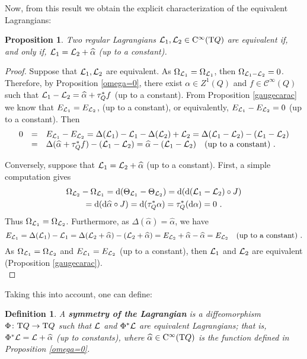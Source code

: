 \documentclass[12pt]{report}
\newtheorem{prop}[teor]{Proposition}
\newtheorem{definition}[teor]{Definition}
\def\qed{\ifvmode\removelastskip\fi
{\unskip\nobreak\hfil\penalty50\hbox{}\nobreak\hfil
\hbox{\vrule height1.2ex width1.2ex}\parfillskip=0pt
\finalhyphendemerits=0 \par\smallskip}}
\def\Lag{{\cal L}}
\def\d{{\rm d}}
\def\Tan{{\rm T}}
\def\Cinfty{{\rm C}^\infty}
\begin{document}
Now, from this result we obtain the explicit characterization of the equivalent Lagrangians:

\begin{prop}
\label{gaugeL}
Two regular Lagrangians $\Lag_1,\Lag_2\in\Cinfty (\Tan Q)$ are
equivalent if, and only if, $\Lag_1=\Lag_2+\widehat\alpha$  (up to a constant).
\end{prop}
\begin{proof}
Suppose that $\Lag_1,\Lag_2$ are equivalent.
As $\Omega_{\Lag_1}=\Omega_{\Lag_1}$, then
$\Omega_{\Lag_1-\Lag_2}=0$. Therefore, by Proposition \ref{omega=0}, 
there exist $\alpha\in Z^1(Q)$ and $f\in \mathcal{C}^\infty(Q)$ such that
$\Lag_1-\Lag_2=\widehat\alpha+\tau_Q^*f$ (up to a constant).
From Proposition \ref{gaugecarac} we know that 
$E_{\Lag_1}= E_{\Lag_2}$,  (up to a constant), or equivalently, 
$E_{\Lag_1}- E_{\Lag_2}=0$ (up to a constant). Then
$$
\begin{array}{lcl}
0&=&E_{\Lag_1}- E_{\Lag_2}=\Delta(\Lag_1)-\Lag_1
-\Delta(\Lag_2)+\Lag_2=\Delta(\Lag_1-\Lag_2)-(\Lag_1-\Lag_2)  \\ &=&
\Delta(\widehat\alpha+\tau_Q^*f)-(\Lag_1-\Lag_2) =
\widehat\alpha-(\Lag_1-\Lag_2)\quad \makebox{(up to a constant)}  \ .
 \end{array}
$$

Conversely, suppose that $\Lag_1=\Lag_2+\widehat\alpha$  (up to a  constant).
First, a simple computation gives
\begin{multline*}
 \Omega_{\Lag_2}-\Omega_{\Lag_1}=
\d(\Theta_{\Lag_1}-\Theta_{\Lag_2})=\d(\d(\Lag_1-\Lag_2)\circ J)\\
=\d(\d\widehat\alpha\circ J)=\d(\tau_Q^*\alpha)=\tau_Q^*(\d\alpha)=0 \ .
\end{multline*}
Thus $\Omega_{\Lag_1}=\Omega_{\Lag_2}$. Furthermore, 
as $\Delta(\widehat\alpha)=\widehat\alpha$, we have
 $$
 E_{\Lag_1}=\Delta(\Lag_1)-\Lag_1=
 \Delta(\Lag_2+\widehat\alpha)-(\Lag_2+\widehat\alpha)=
  E_{\Lag_2} + \widehat\alpha - \widehat\alpha= E_{\Lag_2}\quad
\makebox{\rm (up to a constant)} \ .
 $$
As $\Omega_{\Lag_1}=\Omega_{\Lag_2}$ and 
$ E_{\Lag_1}=E_{\Lag_2}$ (up to a constant), 
then $\Lag_1$ and $\Lag_2$ are equivalent (Proposition \ref{gaugecarac}).
\\ \qed \end{proof}

Taking this into account, one can define:

\begin{definition}
A \textbf{symmetry of the Lagrangian} is
a diffeomorphism $\Phi\colon\Tan Q\to\Tan Q$ such that
$\Lag$ and $\Phi^*\Lag$ are equivalent Lagrangians; that is,
$\Phi^*\Lag=\Lag+\widehat\alpha$ (up to constants),
where $\widehat\alpha\in\Cinfty (\Tan Q)$ is the function defined in Proposition \ref{omega=0}.
\end{definition}
\end{document}
